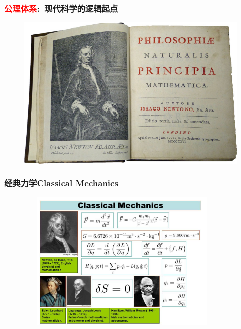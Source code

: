 {
	\frametitle{\textcolor{red}{公理体系}:~现代科学的逻辑起点}
\begin{figure}[h!]
\centering
\vspace{-10.5pt}
\includegraphics[height=0.68\textwidth,width=1.0\textwidth,viewport=0 0 770 500,clip]{Figures/Philp_Nature_Math-2.png}
\label{Philp_Nature}
\end{figure}
}

\frame
{
	\frametitle{经典力学\textrm{Classical Mechanics}}
\begin{figure}[h!]
\vspace*{-0.18in}
\centering
\includegraphics[height=2.65in,width=4.05in,viewport=0 0 715 495,clip]{Figures/Classical_Mechanics.jpg}
\label{Classical_Mechanics}
\end{figure}
}

